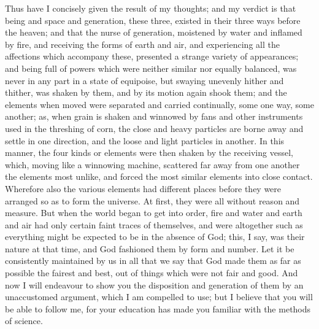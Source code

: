 Thus have I concisely given the result of my thoughts; and my verdict is
that being and space and generation, these three, existed in their three
ways before the heaven; and that the nurse of generation, moistened by
water and inflamed by fire, and receiving the forms of earth and air, and
experiencing all the affections which accompany these, presented a strange
variety of appearances; and being full of powers which were neither
similar nor equally balanced, was never in any part in a state of
equipoise, but swaying unevenly hither and thither, was shaken by them,
and by its motion again shook them; and the elements when moved were
separated and carried continually, some one way, some another; as, when
grain is shaken and winnowed by fans and other instruments used in the
threshing of corn, the close and heavy particles are borne away and settle
in one direction, and the loose and light particles in another. In this
manner, the four kinds or elements were then shaken by the receiving
vessel, which, moving like a winnowing machine, scattered far away from
one another the elements most unlike, and forced the most similar elements
into close contact. Wherefore also the various elements had different
places before they were arranged so as to form the universe. At first,
they were all without reason and measure. But when the world began to get
into order, fire and water and earth and air had only certain faint traces
of themselves, and were altogether such as everything might be expected to
be in the absence of God; this, I say, was their nature at that time, and
God fashioned them by form and number. Let it be consistently maintained
by us in all that we say that God made them as far as possible the fairest
and best, out of things which were not fair and good. And now I will
endeavour to show you the disposition and generation of them by an
unaccustomed argument, which I am compelled to use; but I believe that you
will be able to follow me, for your education has made you familiar with
the methods of science.

